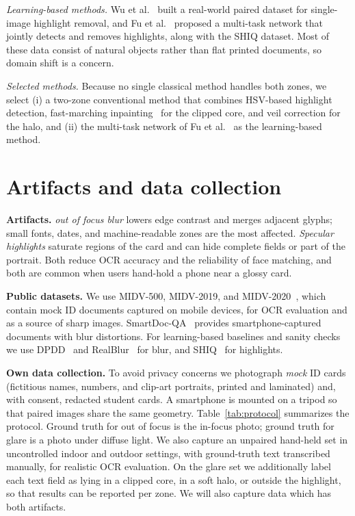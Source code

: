 \documentclass{article}
\begin{document}
\textit{Learning-based methods.} Wu et al.~\cite{wu2021} built a real-world paired dataset for single-image highlight removal, and Fu et al.~\cite{fu2021} proposed a multi-task network that jointly detects and removes highlights, along with the SHIQ dataset. Most of these data consist of natural objects rather than flat printed documents, so domain shift is a concern.

\textit{Selected methods.} Because no single classical method handles both zones, we select (i) a two-zone conventional method that combines HSV-based highlight detection, fast-marching inpainting~\cite{telea2004} for the clipped core, and veil correction for the halo, and (ii) the multi-task network of Fu et al.~\cite{fu2021} as the learning-based method.

\section{Artifacts and data collection}
\label{sec:pagestyle}
\textbf{Artifacts.} \emph{out of focus blur} lowers edge contrast and merges adjacent glyphs; small fonts, dates, and machine-readable zones are the most affected. \emph{Specular highlights} saturate regions of the card and can hide complete fields or part of the portrait. Both reduce OCR accuracy and the reliability of face matching, and both are common when users hand-hold a phone near a glossy card.

\textbf{Public datasets.} We use MIDV-500, MIDV-2019, and MIDV-2020~\cite{arlazarov2019,bulatov2020,bulatov2022}, which contain mock ID documents captured on mobile devices, for OCR evaluation and as a source of sharp images. SmartDoc-QA~\cite{nayef2015} provides smartphone-captured documents with blur distortions. For learning-based baselines and sanity checks we use DPDD~\cite{abuolaim2020} and RealBlur~\cite{rim2020} for blur, and SHIQ~\cite{fu2021} for highlights.

\textbf{Own data collection.} To avoid privacy concerns we photograph \emph{mock} ID cards (fictitious names, numbers, and clip-art portraits, printed and laminated) and, with consent, redacted student cards. A smartphone is mounted on a tripod so that paired images share the same geometry. Table~\ref{tab:protocol} summarizes the protocol. Ground truth for out of focus is the in-focus photo; ground truth for glare is a photo under diffuse light. We also capture an unpaired hand-held set in uncontrolled indoor and outdoor settings, with ground-truth text transcribed manually, for realistic OCR evaluation. On the glare set we additionally label each text field as lying in a clipped core, in a soft halo, or outside the highlight, so that results can be reported per zone. We will also capture data which has both artifacts.
\end{document}
